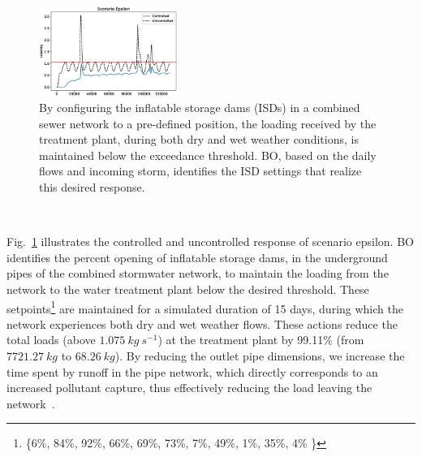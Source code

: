 \begin{figure}[ht]
	\includegraphics[width=0.4\textwidth]{gfx/Chapter-4/generalizability_epsilon.eps}
	\caption{By configuring the inflatable storage dams (ISDs) in a combined sewer network to a pre-defined position, the loading received by the treatment plant, during both dry and wet weather conditions, is maintained below the exceedance threshold. 
	BO, based on the daily flows and incoming storm, identifies the ISD settings that realize this desired response.}\label{fig:epsilon}
\end{figure}

\

Fig.~\ref{fig:epsilon} illustrates the controlled and uncontrolled response of scenario epsilon.
BO identifies the percent opening of inflatable storage dams, in the underground pipes of the combined stormwater network, to maintain the loading from the network to the water treatment plant below the desired threshold.
These setpoints\footnote{ \{6\%, 84\%, 92\%, 66\%, 69\%, 73\%, 7\%, 49\%, 1\%, 35\%, 4\% \} } are maintained for a simulated duration of 15 days, during which the network experiences both dry and wet weather flows.
These actions reduce the total loads (above $1.075\ kg\ s^{-1}$) at the treatment plant by 99.11\% (from $7721.27\ kg$ to $68.26\ kg$).
By reducing the outlet pipe dimensions, we increase the time spent by runoff in the pipe network, which directly corresponds to an increased pollutant capture, thus effectively reducing the load leaving the network~\cite{Troutman_2020}.







